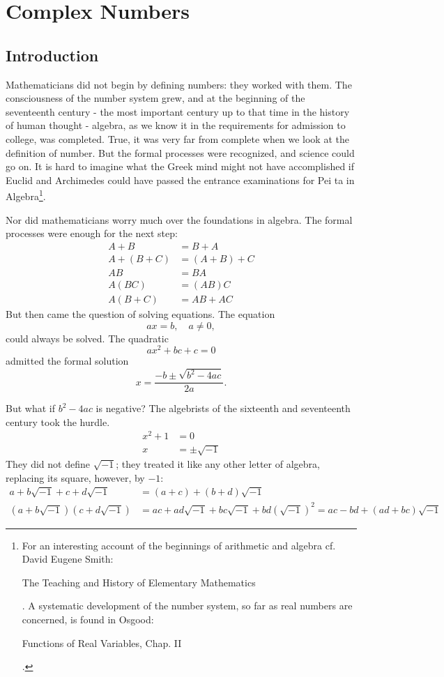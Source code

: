 \documentclass[letter,oneside]{memoir}
\begin{document}
\chapter{Complex Numbers}
\section{Introduction}
Mathematicians did not begin by defining numbers: they worked with them. The consciousness of the number system grew, and at the beginning of the seventeenth century - the most important century up to that time in the history of human thought - algebra, as we know it in the requirements for admission to college, was completed. True, it was very far from complete when we look at the definition of number. But the formal processes were recognized, and science could go on. It is hard to imagine what the Greek mind might not have accomplished if Euclid and Archimedes could have passed the entrance examinations for Pei ta in Algebra\footnote{For an interesting account of the beginnings of arithmetic and algebra cf. David Eugene Smith: \begin{em}The Teaching and History of Elementary Mathematics\end{em}. A systematic development of the number system, so far as real numbers are concerned, is found in Osgood: \begin{em}Functions of Real Variables, Chap. II\end{em}.}.

Nor did mathematicians worry much over the foundations in algebra. The formal processes were enough for the next step: 
\begin{align*}
	A+B&= B+A\\
	A+(B+C)&=(A+B)+C\\
	AB &= BA\\
	A(BC) &= (AB)C\\
	A(B+C) &= AB + AC
\end{align*} But then came the question of solving equations. The equation 
\[
ax=b, \quad a\neq 0
,\] could always be solved. The quadratic 
\[
ax^2+bc+c=0
\] admitted the formal solution 
\[
x=\frac{-b\pm \sqrt{b^2-4ac} }{2a} 
.\]

But what if $b^2-4ac$ is negative? The algebrists of the sixteenth and seventeenth century took the hurdle. 
\begin{align*}
	x^2+1&=0\\
	x&=\pm \sqrt{-1} 
\end{align*} They did not define $\sqrt{-1} $; they treated it like any other letter of algebra, replacing its square, however, by $-1$: 
\begin{align}
	a+b\sqrt{-1} +c +d \sqrt{-1} &= (a+c)+(b+d)\sqrt{-1} \\
	(a+b\sqrt{-1} )(c+d\sqrt{-1}) &= ac+ad\sqrt{-1} +bc\sqrt{-1} +bd\left(\sqrt{-1}  \right) ^2=ac-bd+(ad+bc)\sqrt{-1}\label{1.2mult} 
\end{align} 
\end{document}
